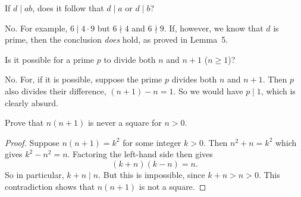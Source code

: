  If $d\mid ab$, does it follow that $d\mid a$ or $d\mid b$?
\begin{solution}
  No. For example, $6\mid 4\cdot9$ but $6\nmid4$ and $6\nmid9$. If,
  however, we know that $d$ is prime, then the conclusion {\em does}
  hold, as proved in Lemma~5.
\end{solution}

 Is it possible for a prime $p$ to divide both $n$ and $n+1$
($n\geq1$)?
\begin{solution}
  No. For, if it is possible, suppose the prime $p$ divides both $n$
  and $n+1$. Then $p$ also divides their difference, $(n+1) - n =
  1$. So we would have $p\mid1$, which is clearly absurd.
\end{solution}

 Prove that $n(n+1)$ is never a square for $n>0$.
\begin{proof}
  Suppose $n(n+1) = k^2$ for some integer $k>0$. Then $n^2+n = k^2$
  which gives $k^2 - n^2 = n$. Factoring the left-hand side then gives
  \begin{equation*}
    (k+n)(k-n) = n.
  \end{equation*}
  So in particular, $k+n\mid n$. But this is impossible, since
  $k+n > n > 0$. This contradiction shows that $n(n+1)$ is not a
  square.
\end{proof}
